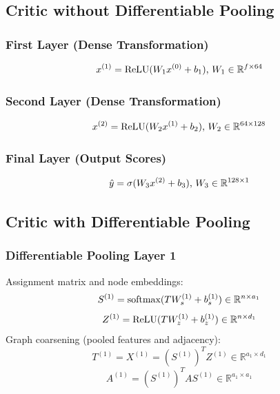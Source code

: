 \documentclass[conference]{IEEEtran}
\begin{document}
\subsection{Critic without Differentiable Pooling}
\subsubsection{First Layer (Dense Transformation)}
\begin{equation}
    x^{(1)} = \textnormal{ReLU}(W_1x^{(0)} + b_1) \textnormal{, } W_1 \in \mathbb{R}^{f \times 64}
    \label{eq:layer_1_nodiff}
\end{equation}
\subsubsection{Second Layer (Dense Transformation)}
\begin{equation}
    x^{(2)} = \textnormal{ReLU}(W_2x^{(1)} + b_2) \textnormal{, } W_2 \in \mathbb{R}^{64 \times 128}
    \label{eq:layer_2_nodiff}
\end{equation}
\subsubsection{Final Layer (Output Scores)}
\begin{equation}
    \hat{y} = \sigma(W_3x^{(2)} + b_3) \textnormal{, } W_3 \in \mathbb{R}^{128 \times 1}
    \label{eq:layer_3_nodiff}
\end{equation}

\subsection{Critic with Differentiable Pooling}
\subsubsection{Differentiable Pooling Layer 1}
\textnormal{Assignment matrix and node embeddings:}
\begin{equation}
    S^{(1)} = \textnormal{softmax}(TW_s^{(1)} + b_s^{(1)}) \in \mathbb{R}^{n \times a_1}
    \label{eq:diffpool_1_S}
\end{equation}
\begin{equation}
    Z^{(1)} = \textnormal{ReLU}(TW_z^{(1)} + b_z^{(1)}) \in \mathbb{R}^{n \times d_1}
    \label{eq:diffpool_1_Z}
\end{equation}
\textnormal{Graph coarsening (pooled features and adjacency):}
\begin{equation}
    T^{(1)} = X^{(1)} = (S^{(1)})^T Z^{(1)} \in \mathbb{R}^{a_1 \times d_1}
    \label{eq:diffpool_1_T}
\end{equation}
\begin{equation}
    A^{(1)} = (S^{(1)})^T AS^{(1)} \in \mathbb{R}^{a_1 \times a_1}
    \label{eq:diffpool_1_A}
\end{equation}
\end{document}
